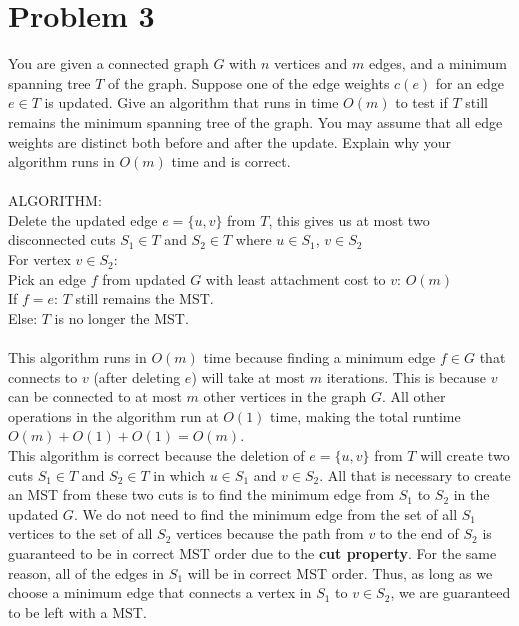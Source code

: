 \documentclass[11pt,letterpaper]{article}
\newcommand\tab[1][1cm]{\hspace*{#1}}
\begin{document}
\section{Problem 3}
You are given a connected graph $G$ with $n$ vertices and $m$ edges, and a minimum spanning tree $T$ of the graph. Suppose one of the edge weights $c(e)$ for an edge $e \in T$ is updated. Give an algorithm that runs in time $O(m)$ to test if $T$ still remains the minimum spanning tree of the graph. You may assume that all edge weights are distinct both before and after the update. Explain why your algorithm runs in $O(m)$ time and is correct. \\\\
ALGORITHM: \\
Delete the updated edge $e=\{u,v\}$ from $T$, this gives us at most two disconnected cuts $S_1 \in T$ and $S_2 \in T$ where $u \in S_1$, $v \in S_2$ \\
For vertex $v \in S_2$: \\
\tab Pick an edge $f$ from updated $G$ with least attachment cost to $v$: $O(m)$ \\
\tab If $f = e$: $T$ still remains the MST. \\ 
\tab Else: $T$ is no longer the MST. \\\\
This algorithm runs in $O(m)$ time because finding a minimum edge $f \in G$ that connects to $v$ (after deleting $e$) will take at most $m$ iterations. This is because $v$ can be connected to at most $m$ other vertices in the graph $G$. All other operations in the algorithm run at $O(1)$ time, making the total runtime $O(m)+O(1)+O(1) = O(m)$. \\
This algorithm is correct because the deletion of $e=\{u,v\}$ from $T$ will create two cuts $S_1 \in T$ and $S_2 \in T$ in which $u \in S_1$ and $v \in S_2$. All that is necessary to create an MST from these two cuts is to find the minimum edge from $S_1$ to $S_2$ in the updated $G$. We do not need to find the minimum edge from the set of all $S_1$ vertices to the set of all $S_2$ vertices because the path from $v$ to the end of $S_2$ is guaranteed to be in correct MST order due to the \textbf{cut property}. For the same reason, all of the edges in $S_1$ will be in correct MST order. Thus, as long as we choose a minimum edge that connects a vertex in $S_1$ to $v \in S_2$, we are guaranteed to be left with a MST. 

\pagebreak

\end{document}
